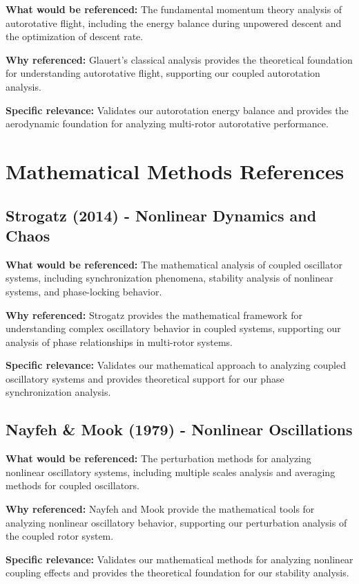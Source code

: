 \documentclass{article}
\begin{document}
\textbf{What would be referenced:} The fundamental momentum theory analysis of autorotative flight, including the energy balance during unpowered descent and the optimization of descent rate.

\textbf{Why referenced:} Glauert's classical analysis provides the theoretical foundation for understanding autorotative flight, supporting our coupled autorotation analysis.

\textbf{Specific relevance:} Validates our autorotation energy balance and provides the aerodynamic foundation for analyzing multi-rotor autorotative performance.

\section{Mathematical Methods References}

\subsection{Strogatz (2014) - Nonlinear Dynamics and Chaos}

\textbf{What would be referenced:} The mathematical analysis of coupled oscillator systems, including synchronization phenomena, stability analysis of nonlinear systems, and phase-locking behavior.

\textbf{Why referenced:} Strogatz provides the mathematical framework for understanding complex oscillatory behavior in coupled systems, supporting our analysis of phase relationships in multi-rotor systems.

\textbf{Specific relevance:} Validates our mathematical approach to analyzing coupled oscillatory systems and provides theoretical support for our phase synchronization analysis.

\subsection{Nayfeh & Mook (1979) - Nonlinear Oscillations}

\textbf{What would be referenced:} The perturbation methods for analyzing nonlinear oscillatory systems, including multiple scales analysis and averaging methods for coupled oscillators.

\textbf{Why referenced:} Nayfeh and Mook provide the mathematical tools for analyzing nonlinear oscillatory behavior, supporting our perturbation analysis of the coupled rotor system.

\textbf{Specific relevance:} Validates our mathematical methods for analyzing nonlinear coupling effects and provides the theoretical foundation for our stability analysis.
\end{document}
